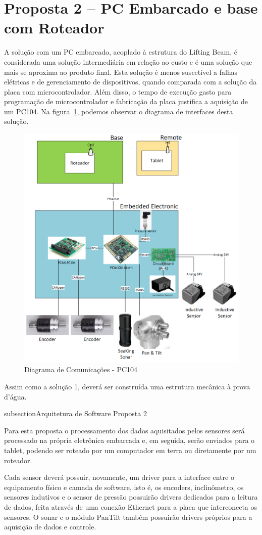 \section{Proposta 2 – PC Embarcado e base com Roteador}

A solução com um PC embarcado, acoplado à estrutura do Lifting Beam, é
considerada uma solução intermediária em relação ao custo e é uma solução que
mais se aproxima ao produto final. Esta solução é menos suscetível a falhas
elétricas e de gerenciamento de dispositivos, quando comparada com a solução da
placa com microcontrolador. Além disso, o tempo de execução gasto para programação de microcontrolador e fabricação da placa justifica a aquisição de um PC104. Na figura~\ref{pc104}, podemos observar o diagrama de interfaces desta solução.

\begin{figure}[H]
    \centering
    \includegraphics[width=0.5\columnwidth]{figs/eletronica/4.png}
    \caption{Diagrama de Comunicações - PC104}
    \label{pc104}
\end{figure} 
 
Assim como a solução 1, deverá ser construída uma estrutura mecânica à prova d’água.

subsection{Arquitetura de Software Proposta 2}

Para esta proposta o processamento dos dados aquisitados pelos sensores será
processado na própria eletrônica embarcada e, em seguida,
 serão enviados para o tablet, podendo ser roteado por um computador em terra ou
 diretamente por um roteador.
 
Cada sensor deverá possuir, novamente, um driver para a interface entre o
equipamento físico e camada de software,
 isto é, os encoders, inclinômetro, os sensores indutivos e o sensor de pressão
 possuirão drivers dedicados para a leitura de dados,
feita através de uma conexão Ethernet para a placa que interconecta os sensores.
O sonar e o módulo PanTilt também possuirão drivers próprios para a aquisição de
dados e controle.


